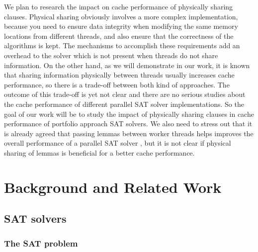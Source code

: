 \documentclass[12pt]{diicc}
\begin{document}
We plan to research the impact on cache performance of physically sharing clauses. Physical sharing obviously involves a more complex implementation, because you need to ensure data integrity when modifying the same memory locations from different threads, and also ensure that the correctness of the algorithms is kept. The mechanisms to accomplish these requirements add an overhead to the solver which is not present when threads do not share information. On the other hand, as we will demonstrate in our work, it is known that sharing information physically between threads usually increases cache performance, so there is a trade-off between both kind of approaches. The outcome of this trade-off is yet not clear and there are no serious studies about the cache performance of different parallel SAT solver implementations. So the goal of our work will be to study the impact of physically sharing clauses in cache performance of portfolio approach SAT solvers. We also need to stress out that it is already agreed that passing lemmas between worker threads helps improves the overall performance of a parallel SAT solver \cite{overview}, but it is not clear if physical sharing of lemmas is beneficial for a better cache performance.




%
% 
\chapter{Background and Related Work}\label{chap:background}
\section{SAT solvers}

\subsection{The SAT problem}
\end{document}
